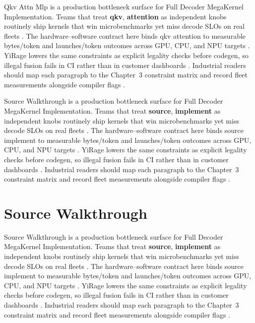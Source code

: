 Qkv Attn Mlp is a production bottleneck surface for Full Decoder MegaKernel Implementation. Teams that treat \textbf{qkv}, \textbf{attention} as independent knobs routinely ship kernels that win microbenchmarks yet miss decode SLOs on real fleets \citep{patel2025llminference,nvidia2022hopper}. The hardware--software contract here binds qkv attention to measurable bytes/token and launches/token outcomes across GPU, CPU, and NPU targets \citep{taxbreak2026,semianalysis2024tma}. YiRage lowers the same constraints as explicit legality checks before codegen, so illegal fusion fails in CI rather than in customer dashboards \citep{memoryfloor2026,amd2024xdna}. Industrial readers should map each paragraph to the Chapter~3 constraint matrix and record fleet measurements alongside compiler flags \citep{nvidia2022hopper,amd2024aie}.

Source Walkthrough is a production bottleneck surface for Full Decoder MegaKernel Implementation. Teams that treat \textbf{source}, \textbf{implement} as independent knobs routinely ship kernels that win microbenchmarks yet miss decode SLOs on real fleets \citep{taxbreak2026,semianalysis2024tma}. The hardware--software contract here binds source implement to measurable bytes/token and launches/token outcomes across GPU, CPU, and NPU targets \citep{memoryfloor2026,amd2024xdna}. YiRage lowers the same constraints as explicit legality checks before codegen, so illegal fusion fails in CI rather than in customer dashboards \citep{nvidia2022hopper,amd2024aie}. Industrial readers should map each paragraph to the Chapter~3 constraint matrix and record fleet measurements alongside compiler flags \citep{semianalysis2024tma,dlbook}.

\section{Source Walkthrough}
\label{sec:source_walkthrough}

Source Walkthrough is a production bottleneck surface for Full Decoder MegaKernel Implementation. Teams that treat \textbf{source}, \textbf{implement} as independent knobs routinely ship kernels that win microbenchmarks yet miss decode SLOs on real fleets \citep{memoryfloor2026,amd2024xdna}. The hardware--software contract here binds source implement to measurable bytes/token and launches/token outcomes across GPU, CPU, and NPU targets \citep{nvidia2022hopper,amd2024aie}. YiRage lowers the same constraints as explicit legality checks before codegen, so illegal fusion fails in CI rather than in customer dashboards \citep{semianalysis2024tma,dlbook}. Industrial readers should map each paragraph to the Chapter~3 constraint matrix and record fleet measurements alongside compiler flags \citep{amd2024xdna,dao2022flashattention}.

